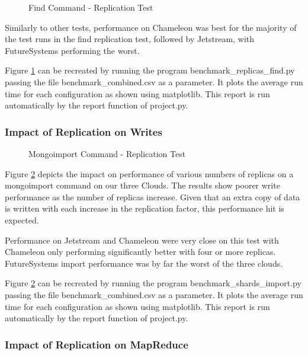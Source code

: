 \documentclass[9pt,twocolumn,twoside]{../../styles/osajnl}
\begin{document}
\begin{figure}[htbp]
\centering
{}
\caption{Find Command - Replication Test}
\label{fig:replica-find}
\end{figure}

Similarly to other tests, performance on Chameleon was best for the
majority of the test runs in the find replication test, followed by
Jetstream, with FutureSystems performing the worst.

Figure \ref{fig:replica-find} can be recreated by running the program
benchmark\_replicas\_find.py passing the file benchmark\_combined.csv
as a parameter. It plots the average run time for each configuration
as shown using matplotlib. This report is run automatically by the
report function of project.py.



\subsubsection{Impact of Replication on Writes}


\begin{figure}[htbp]
\centering
{}
\caption{Mongoimport Command - Replication Test}
\label{fig:replica-import}
\end{figure}


Figure \ref{fig:replica-import} depicts the impact on performance of
various numbers of replicas on a mongoimport command on our three
Clouds. The results show poorer write performance as the number of
replicas increase. Given that an extra copy of data is written with
each increase in the replication factor, this performance hit is
expected.




Performance on Jetstream and Chameleon were very close on this test
with Chameleon only performing significantly better with four or more
replicas. FutureSystems import performance was by far the worst of the
three clouds.

Figure \ref{fig:replica-import} can be recreated by running the
program benchmark\_shards\_import.py passing the file
benchmark\_combined.csv as a parameter. It plots the average run time
for each configuration as shown using matplotlib. This report is run
automatically by the report function of project.py.


\subsubsection{Impact of Replication on MapReduce}
\end{document}
